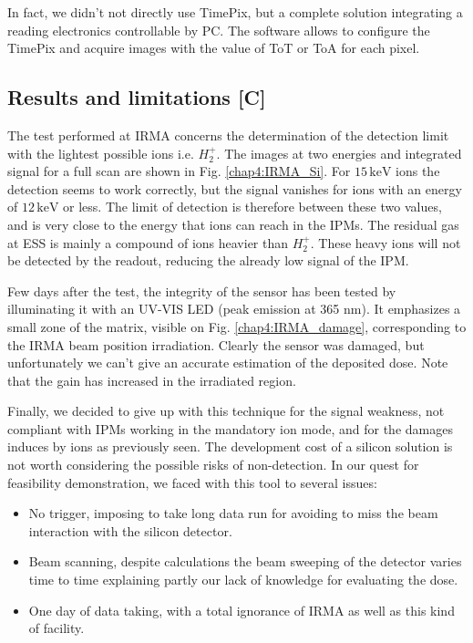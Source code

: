 \begin{refsection}
  In fact, we didn't not directly use TimePix, but a complete solution \cite{Kraus2011,advacam2019} integrating a reading electronics controllable by PC. The software allows to configure the TimePix and acquire images with the value of ToT or ToA for each pixel.

  \subsection{Results and limitations [C]}

  The test performed at IRMA concerns the determination of the detection limit with the lightest possible ions i.e. $H_{2}^{+}$. The images at two energies and integrated signal for a full scan are shown in Fig. \ref{chap4:IRMA_Si}. For $15\,\mathrm{keV}$ ions the detection seems to work correctly, but the signal vanishes for ions with an energy of $12\,\mathrm{keV}$ or less. The limit of detection is therefore between these two values, and is very close to the energy that ions can reach in the IPMs. The residual gas at ESS is mainly a compound of ions heavier than $H_{2}^{+}$. These heavy ions will not be detected by the readout, reducing the already low signal of the IPM.

  

  

  Few days after the test, the integrity of the sensor has been tested by illuminating it with an UV-VIS LED (peak emission at 365 nm). It emphasizes a small zone of the matrix, visible on Fig. \ref{chap4:IRMA_damage}, corresponding to the IRMA  beam position irradiation. Clearly the sensor was damaged, but unfortunately we can't give an accurate estimation of the deposited dose. Note that the gain has increased in the irradiated region.

  Finally, we decided to give up with this technique for the signal weakness, not compliant with IPMs working in the mandatory  ion mode, and for the damages induces by ions as previously seen. The development cost of a silicon solution is not worth considering the possible risks of non-detection.
  In our quest for feasibility demonstration, we faced with this tool to several issues:
  \begin{itemize}
    \item No trigger, imposing to take long data run for avoiding to miss the beam interaction with the silicon detector.
    \item Beam scanning, despite calculations the beam sweeping of the detector varies time to time explaining partly our lack of knowledge for evaluating the dose.
    \item One day of data taking, with a total ignorance of IRMA as well as this kind of facility.
  \end{itemize}


\end{refsection}
